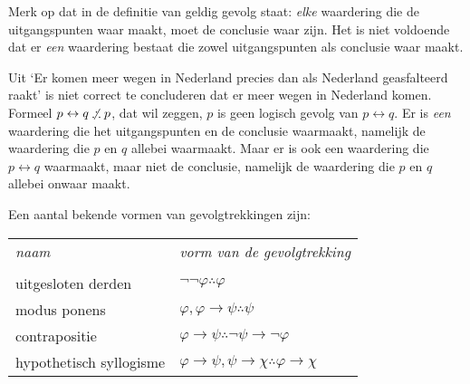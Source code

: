 Merk op dat in de definitie van geldig gevolg staat: \textit{elke} waardering die de uitgangspunten waar maakt, moet de conclusie waar zijn. Het is niet voldoende dat er \textit{een} waardering bestaat die zowel uitgangspunten als conclusie waar maakt.

\begin{example}\label{ex:no:gevolg}
Uit `Er komen meer wegen in Nederland precies dan als Nederland geasfalteerd raakt' is niet correct te concluderen dat er meer wegen in Nederland komen. Formeel $p\leftrightarrow q\not\therefore p$, dat wil zeggen, $p$ is geen logisch gevolg van $p\leftrightarrow q$. Er is \textit{een} waardering die het uitgangspunten en de conclusie waarmaakt, namelijk de waardering die $p$ en $q$ allebei waarmaakt. Maar er is ook een waardering die $p\leftrightarrow q$ waarmaakt, maar niet de conclusie, namelijk de waardering die $p$ en $q$ allebei onwaar maakt.\\
\end{example}

Een aantal bekende vormen van gevolgtrekkingen zijn:\\
\begin{tabular}{|p{4cm}p{6cm}|}
\hline
\textit{naam}&\textit{vorm van de gevolgtrekking}\\
&\\
uitgesloten derden&$\neg\neg\varphi\therefore\varphi$\\
modus ponens&$\varphi,\varphi\rightarrow\psi\therefore\psi$\\
contrapositie&$\varphi\rightarrow\psi\therefore\neg\psi\rightarrow\neg\varphi$\\
hypothetisch syllogisme&$\varphi\rightarrow\psi,\psi\rightarrow\chi\therefore\varphi\rightarrow\chi$\\
\hline
\end{tabular}\label{tab:gevolg}\vspace{2mm}

